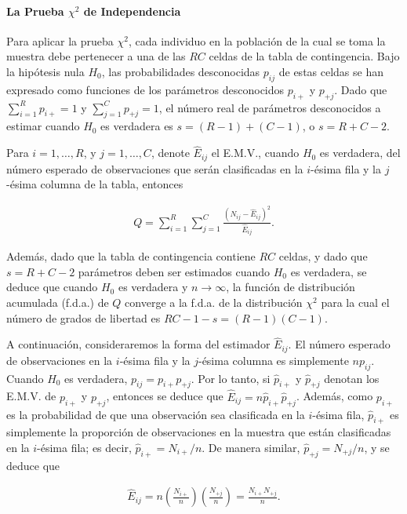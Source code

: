 \documentclass{book}
\begin{document}
\paragraph*{La Prueba $\chi^2$ de Independencia}
Para aplicar la prueba $\chi^2$, cada individuo en la población de la cual se toma la muestra debe pertenecer a una de las $RC$ celdas de la tabla de contingencia. Bajo la hipótesis nula $H_0$, las probabilidades desconocidas $p_{ij}$ de estas celdas se han expresado como funciones de los parámetros desconocidos $p_{i+}$ y $p_{+j}$. Dado que $\sum_{i=1}^{R} p_{i+} = 1$ y $\sum_{j=1}^{C} p_{+j} = 1$, el número real de parámetros desconocidos a estimar cuando $H_0$ es verdadera es $s = (R - 1) + (C - 1)$, o $s = R + C - 2$.

Para $i = 1, \ldots, R$, y $j = 1, \ldots, C$, denote $\hat{E}_{ij}$ el E.M.V., cuando $H_0$ es verdadera, del número esperado de observaciones que serán clasificadas en la $i$-ésima fila y la $j$-ésima columna de la tabla, entonces

\begin{align}
Q = \sum_{i=1}^{R} \sum_{j=1}^{C} \frac{(N_{ij} - \hat{E}_{ij})^2}{\hat{E}_{ij}}.
\end{align}

Además, dado que la tabla de contingencia contiene $RC$ celdas, y dado que $s = R + C - 2$ parámetros deben ser estimados cuando $H_0$ es verdadera, se deduce que cuando $H_0$ es verdadera y $n \to \infty$, la función de distribución acumulada (f.d.a.) de $Q$ converge a la f.d.a. de la distribución $\chi^2$ para la cual el número de grados de libertad es $RC - 1 - s = (R - 1)(C - 1)$.

A continuación, consideraremos la forma del estimador $\hat{E}_{ij}$. El número esperado de observaciones en la $i$-ésima fila y la $j$-ésima columna es simplemente $np_{ij}$. Cuando $H_0$ es verdadera, $p_{ij} = p_{i+}p_{+j}$. Por lo tanto, si $\hat{p}_{i+}$ y $\hat{p}_{+j}$ denotan los E.M.V. de $p_{i+}$ y $p_{+j}$, entonces se deduce que $\hat{E}_{ij} = n\hat{p}_{i+}\hat{p}_{+j}$. Además, como $p_{i+}$ es la probabilidad de que una observación sea clasificada en la $i$-ésima fila, $\hat{p}_{i+}$ es simplemente la proporción de observaciones en la muestra que están clasificadas en la $i$-ésima fila; es decir, $\hat{p}_{i+} = N_{i+}/n$. De manera similar, $\hat{p}_{+j} = N_{+j}/n$, y se deduce que

\begin{align}
\hat{E}_{ij} = n\left(\frac{N_{i+}}{n}\right)\left(\frac{N_{+j}}{n}\right) = \frac{N_{i+}N_{+j}}{n}.
\end{align}
\end{document}
